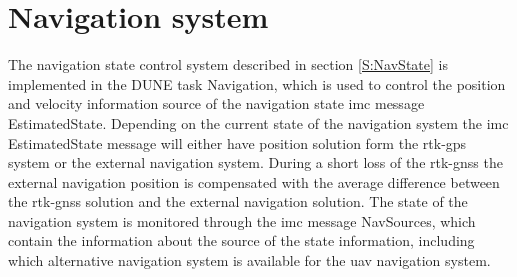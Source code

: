 \section{Navigation system}\label{IMP:NavSys}
The navigation state control system described in section \ref{S:NavState} is implemented in the DUNE task Navigation, which is used to control the position and velocity information source of the navigation state \gls{imc} message EstimatedState. Depending on the current state of the navigation system the \gls{imc} EstimatedState message will either have position solution form the \gls{rtk-gps} system or the external navigation system. During a short loss of the \gls{rtk-gnss} the external navigation position is compensated with the average difference between the \gls{rtk-gnss} solution and the external navigation solution. The state of the navigation system is monitored through the \gls{imc} message NavSources, which contain the information about the source of the state information, including which alternative navigation system is available for the \gls{uav} navigation system.
